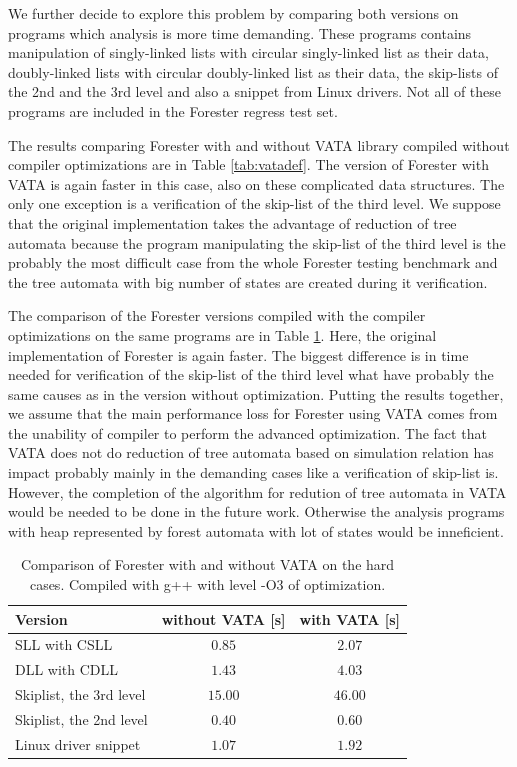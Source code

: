 We further decide to explore this problem by comparing
both versions on programs which analysis is more time demanding.
These programs contains manipulation of singly-linked lists with
circular singly-linked list as their data, doubly-linked lists with
circular doubly-linked list as their data, the skip-lists of the 2nd and
the 3rd level and also a snippet from Linux drivers.
Not all of these programs are included in the Forester regress test set.

The results comparing Forester with and without VATA library compiled
without compiler optimizations are in Table \ref{tab:vatadef}.
The version of Forester with VATA is again faster in this case, also
on these complicated data structures.
The only one exception is a verification of the skip-list of the third
level.
We suppose that the original implementation takes the advantage of
reduction of tree automata because the program manipulating the skip-list
of the third level is the probably the most difficult case from the whole
Forester testing benchmark and the tree automata with big number of states
are created during it verification.

The comparison of the Forester versions compiled with the compiler optimizations
on the same programs are in Table \ref{tab:vataopt}.
Here, the original implementation of Forester is again faster.
The biggest difference is in time needed for verification of the skip-list of the third level
what have probably the same causes as in the version without optimization.
Putting the results together, we assume that the main performance
loss for Forester using VATA comes from the unability of compiler
to perform the advanced optimization.
The fact that VATA does not do reduction of tree automata based on simulation relation
has impact probably mainly in the demanding cases like a verification of skip-list is.
However, the completion of the algorithm for redution of tree automata in VATA would be
needed to be done in the future work.
Otherwise the analysis programs with heap represented by forest automata with lot of states
would be inneficient.

\begin{table}[buh]
	\vskip6pt
	\centering
	\begin{tabular}{|l | c | c |}
		\hline
		Version & without VATA [s] & with VATA [s] \\
		\hline
		\hline
		SLL with CSLL            & $0.85$ & $2.07$  \\
		\hline
		DLL with CDLL            & $1.43$ & $4.03$ \\
		\hline
		Skiplist, the 3rd level  & $15.00$ & $46.00$ \\
		\hline
		Skiplist, the 2nd level  & $0.40$ & $0.60$  \\
		\hline
		Linux driver snippet     & $1.07$ & $1.92$  \\ 
		\hline
	\end{tabular}
	\caption{Comparison of Forester with and without VATA on the hard cases.
		Compiled with g++ with level -O3 of optimization.
	}
	\label{tab:vataopt}
\end{table}

